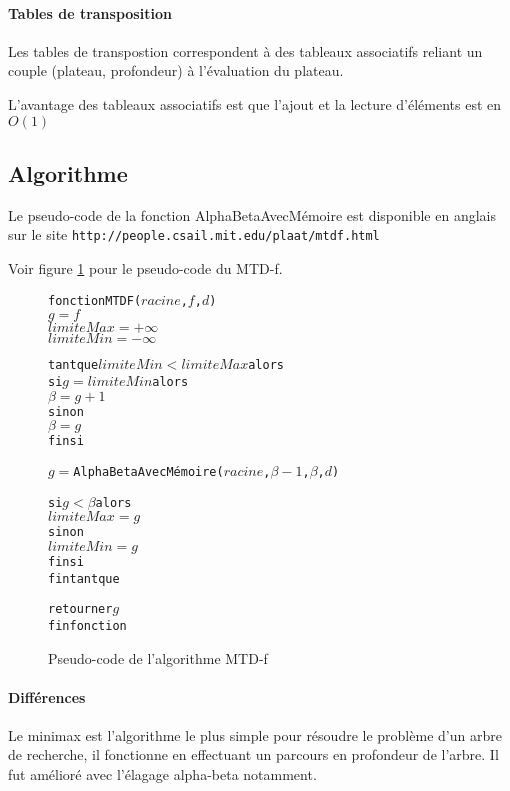         \paragraph{Tables de transposition}
        Les tables de transpostion correspondent à des tableaux associatifs
        reliant un couple (plateau, profondeur) à l'évaluation du plateau.
        
        L'avantage des tableaux associatifs est que l'ajout et la lecture 
        d'éléments est en $O(1)$

    \subsection{Algorithme}
    
    Le pseudo-code de la fonction AlphaBetaAvecMémoire est disponible en
    anglais sur le site \texttt{http://people.csail.mit.edu/plaat/mtdf.html}
	
	\vspace{1em}
	Voir figure \ref{fig:pseudocode_mtdf} pour le pseudo-code du MTD-f.

    \begin{figure}[h!]

        \begin{framed}
        \begin{alltt}
fonction MTDF(\(racine\), \(f\), \(d\))
    \(g = f\)
    \(limiteMax = +\infty{}\)
    \(limiteMin = -\infty{}\)

    tant que \(limiteMin < limiteMax\) alors
        si \(g = limiteMin\) alors
            \(\beta{} = g+1\)
        sinon
           \(\beta{} = g\)
        fin si

        \(g =\) AlphaBetaAvecMémoire(\(racine\), \(\beta{}-1\), \(\beta{}\), \(d\))

        si \(g < \beta{}\) alors
            \(limiteMax = g\)
        sinon
            \(limiteMin = g\)
        fin si
    fin tant que

    retourner \(g\)
fin fonction

        \end{alltt}
        \end{framed}

        \caption{Pseudo-code de l'algorithme MTD-f}
    \label{fig:pseudocode_mtdf}
    \end{figure}


    \paragraph{Différences} Le minimax est l'algorithme le 
    plus simple pour résoudre le problème d'un arbre de recherche,
	il fonctionne en effectuant un parcours en profondeur de l'arbre.
	Il fut amélioré avec l'élagage alpha-beta notamment. 
    
